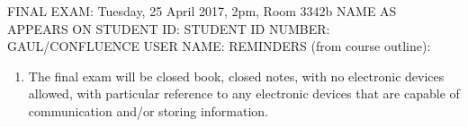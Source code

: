 \documentclass{exam}
\begin{document}
FINAL EXAM: Tuesday, 25 April 2017, 2pm, Room 3342b\newline
\newline
\newline
\newline
NAME AS APPEARS ON STUDENT ID:\newline
\newline
STUDENT ID NUMBER:\newline
\newline
GAUL/CONFLUENCE USER NAME:\newline
\newline
REMINDERS (from course outline):
\begin{enumerate}
\item The final exam will be closed book, closed notes, with no electronic devices allowed, with particular reference to any electronic devices that are capable of communication and/or storing information.
\end{enumerate}
\newpage
\end{document}
